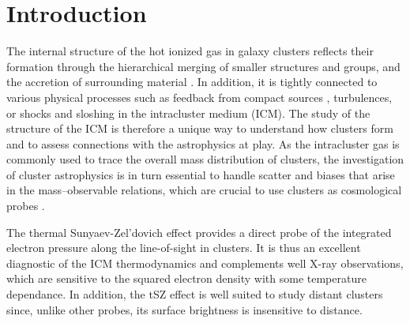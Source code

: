 \documentclass[twocolumn,traditabstract]{aa}
\begin{document}
\maketitle

\section{Introduction}
The internal structure of the hot ionized gas in galaxy clusters reflects their formation through the hierarchical merging of smaller structures and groups, and the accretion of surrounding material \citep[e.g.][and references therein]{Kravtsov2012}. In addition, it is tightly connected to various physical processes such as feedback from compact sources \citep[e.g.][]{Fabian2012}, turbulences, or shocks and sloshing \citep[e.g.][]{Markevitch2007} in the intracluster medium (ICM). The study of the structure of the ICM is therefore a unique way to understand how clusters form and to assess connections with the astrophysics at play. As the intracluster gas is commonly used to trace the overall mass distribution of clusters, the investigation of cluster astrophysics is in turn essential to handle scatter and biases that arise in the mass--observable relations, which are crucial to use clusters as cosmological probes \citep[see, e.g.][for a review]{Allen2011}.

The thermal Sunyaev-Zel'dovich \citep[tSZ,][]{Sunyaev1972} effect provides a direct probe of the integrated electron pressure along the line-of-sight in clusters. It is thus an excellent diagnostic of the ICM thermodynamics and complements well X-ray observations, which are sensitive to the squared electron density with some temperature dependance. In addition, the tSZ effect is well suited to study distant clusters since, unlike other probes, its surface brightness is insensitive to distance.
\end{document}
